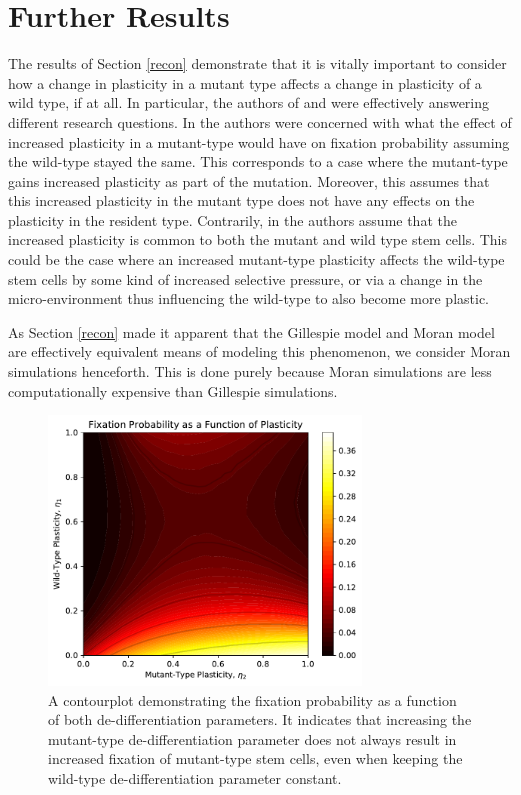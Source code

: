 \documentclass[12pt]{article}
\begin{document}
\section{Further Results}\label{further}
The results of Section \ref{recon} demonstrate that it is vitally important to consider how a change in plasticity in a mutant type affects a change in plasticity of a wild type, if at all.
In particular, the authors of \cite{mohammad} and \cite{wodarz} were effectively answering different research questions. In \cite{mohammad} the authors were concerned with what the effect of increased plasticity in a mutant-type would have on fixation probability assuming the wild-type stayed the same. This corresponds to a case where the mutant-type gains increased plasticity as part of the mutation. Moreover, this assumes that this increased plasticity in the mutant type does not have any effects on the plasticity in the resident type. Contrarily, in \cite{wodarz} the authors assume that the increased plasticity is common to both the mutant and wild type stem cells. This could be the case where an increased mutant-type plasticity affects the wild-type stem cells by some kind of increased selective pressure, or via a change in the micro-environment thus influencing the wild-type to also become more plastic.

As Section \ref{recon} made it apparent that the Gillespie model and Moran model are effectively equivalent means of modeling this phenomenon, we consider Moran simulations henceforth. This is done purely because Moran simulations are less computationally expensive than Gillespie simulations.

\begin{figure}[ht]
\begin{center}
\includegraphics[width=0.74\textwidth]{contourplot.pdf}
\end{center}
\caption{A contourplot demonstrating the fixation probability as a function of both de-differentiation parameters. It indicates that increasing the mutant-type de-differentiation parameter does not always result in increased fixation of mutant-type stem cells, even when keeping the wild-type de-differentiation parameter constant.}\label{contour}
\end{figure}
\end{document}
